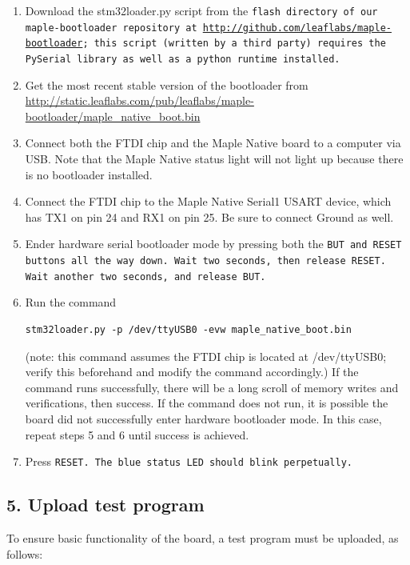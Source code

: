 \documentclass[a4paper,12pt]{report}
\begin{document}
\begin{enumerate}
\item Download the stm32loader.py script from the \tt flash \rm directory of our maple-bootloader repository at \url{http://github.com/leaflabs/maple-bootloader}; this script (written by a third party) requires the PySerial library as well as a python runtime installed.
\item Get the most recent stable version of the bootloader from \url{http://static.leaflabs.com/pub/leaflabs/maple-bootloader/maple_native_boot.bin}
\item Connect both the FTDI chip and the Maple Native board to a computer via USB. Note that the Maple Native status light will not light up because there is no bootloader installed. 
\item Connect the FTDI chip to the Maple Native Serial1 USART device, which has TX1 on pin 24 and RX1 on pin 25. Be sure to connect Ground as well.
\item Ender hardware serial bootloader mode by pressing both the \tt BUT \rm and \tt RESET \rm buttons all the way down. Wait two seconds, then release \tt RESET. \rm Wait another two seconds, and release \tt BUT. \rm
\item Run the command \begin{verbatim}stm32loader.py -p /dev/ttyUSB0 -evw maple_native_boot.bin\end{verbatim} (note: this command assumes the FTDI chip is located at /dev/ttyUSB0; verify this beforehand and modify the command accordingly.) If the command runs successfully, there will be a long scroll of memory writes and verifications, then success. If the command does not run, it is possible the board did not successfully enter hardware bootloader mode. In this case, repeat steps 5 and 6 until success is achieved.
\item Press \tt RESET. \rm The blue status LED should blink perpetually.
\end{enumerate}

\clearpage
\subsection*{5. Upload test program}
To ensure basic functionality of the board, a test program must be uploaded, as follows:
\end{document}
